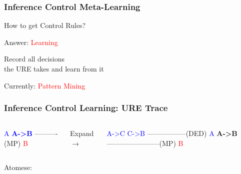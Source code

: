 \documentclass{beamer}
\begin{document}
\begin{frame}
  \frametitle{Inference Control Meta-Learning}

  How to get Control Rules?

  Answer: \textcolor{red}{Learning}

  \begin{center}
    \alert{Record all decisions}\\
    the URE takes and \alert{learn} from it
  \end{center}

  Currently: \textcolor{red}{Pattern Mining}

\end{frame}

\begin{frame}[fragile]
  \frametitle{Inference Control Learning: URE Trace}

\begin{columns}
\column{.6in}
{\tiny \begin{semiverbatim}
\textcolor{blue}{A  {\bf A->B}}
----------(MP)      
   \textcolor{red}{B}
\end{semiverbatim}}
\column{0.1in}
{\Tiny Expand}
$\rightarrow$
\column{2in}
{\tiny \begin{semiverbatim}
        \textcolor{blue}{A->C   C->B}
        -----------------(DED)
\textcolor{blue}{A}          {\bf A->B}
-----------------------(MP)
       \textcolor{red}{B}
\end{semiverbatim}}
\end{columns}

{\tiny Atomese:}

\begin{columns}

\column{1in}
  

\end{columns}
\end{frame}
\end{document}
